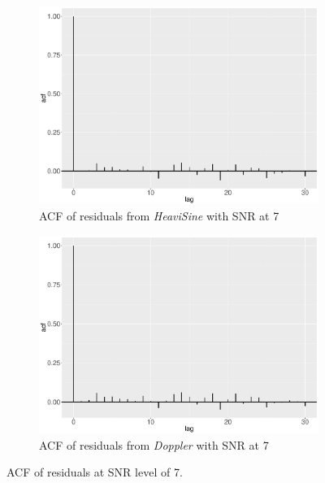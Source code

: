 \begin{figure}[!ht]
\begin{subfigure}{0.45\textwidth}
    \end{subfigure}
    \begin{subfigure}{0.45\textwidth}
    \centering
    \includegraphics[width=\textwidth]{Chapters/02TractorSplineTheory/plot/ggplot/ggacfHeavi7.pdf}
    \caption{ACF of residuals from \textit{HeaviSine} with SNR at 7 }
    \end{subfigure}
    \begin{subfigure}{0.45\textwidth}
    \centering
    \includegraphics[width=\textwidth]{Chapters/02TractorSplineTheory/plot/ggplot/ggacfDoppler7.pdf}
    \caption{ACF of residuals from \textit{Doppler} with SNR at 7 }
    \end{subfigure}
\caption{ACF of residuals at SNR level of 7.}\label{tractorsplineSNR7acf}
 \end{figure}

